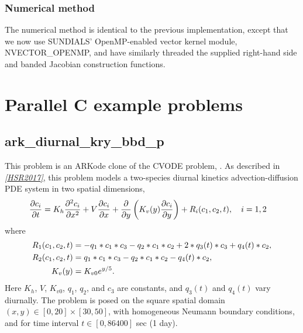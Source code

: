 \documentclass[letterpaper,10pt,english]{sphinxmanual}
\begin{document}
\subsection{Numerical method}
\label{c_openmp:numerical-method}
The numerical method is identical to the previous implementation,
except that we now use SUNDIALS' OpenMP-enabled vector kernel module,
NVECTOR\_OPENMP, and have similarly threaded the supplied right-hand
side and banded Jacobian construction functions.


\chapter{Parallel C example problems}
\label{c_parallel::doc}\label{c_parallel:parallel-c-example-problems}\label{c_parallel:parallel-c}

\section{ark\_diurnal\_kry\_bbd\_p}
\label{c_parallel:ark-diurnal-kry-bbd-p}\label{c_parallel:id1}
This problem is an ARKode clone of the CVODE problem,
.  As described in \label{c_parallel:id2}{\hyperref[References:hsr2017]{\emph{{[}HSR2017{]}}}}, this problem
models a two-species diurnal kinetics advection-diffusion PDE system
in two spatial dimensions,
\begin{gather}
\begin{split}\frac{\partial c_i}{\partial t} &=
  K_h \frac{\partial^2 c_i}{\partial x^2} +
  V \frac{\partial     c_i}{\partial x} +
  \frac{\partial}{\partial y}\left( K_v(y)
  \frac{\partial c_i}{\partial y}\right) +
  R_i(c_1,c_2,t),\quad i=1,2\end{split}\notag
\end{gather}
where
\begin{gather}
\begin{split}R_1(c_1,c_2,t) &= -q_1*c_1*c_3 - q_2*c_1*c_2 + 2*q_3(t)*c_3 + q_4(t)*c_2, \\
R_2(c_1,c_2,t) &=  q_1*c_1*c_3 - q_2*c_1*c_2 - q_4(t)*c_2, \\
K_v(y) &= K_{v0} e^{y/5}.\end{split}\notag
\end{gather}
Here \(K_h\), \(V\), \(K_{v0}\), \(q_1\), \(q_2\),
and \(c_3\) are constants, and \(q_3(t)\) and \(q_4(t)\)
vary diurnally.  The problem is posed on the square spatial domain
\((x,y) \in [0,20]\times[30,50]\), with homogeneous Neumann
boundary conditions, and for time interval \(t\in [0,86400]\) sec
(1 day).
\end{document}
